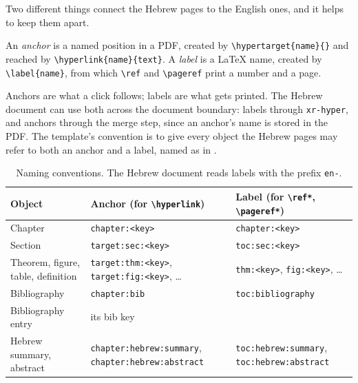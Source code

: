 

Two different things connect the Hebrew pages to the English ones, and it helps to keep them apart.

\begin{definition}
\label{def:anchor}\hypertarget{target:def:anchor}{}%
An \emph{anchor} is a named position in a PDF, created by \verb|\hypertarget{name}{}| and reached by \verb|\hyperlink{name}{text}|. A \emph{label} is a LaTeX name, created by \verb|\label{name}|, from which \verb|\ref| and \verb|\pageref| print a number and a page.
\end{definition}

Anchors are what a click follows; labels are what gets printed.
The Hebrew document can use both across the document boundary: labels through \texttt{xr-hyper}, and anchors through the merge step, since an anchor's name is stored in the PDF.
The template's convention is to give every object the Hebrew pages may refer to both an anchor and a label, named as in .

\begin{table}[htb]
    \centering
    \caption{Naming conventions. The Hebrew document reads labels with the prefix \texttt{en-}.}
    \label{tab:naming}\hypertarget{target:tab:naming}{}%
    \begin{tabular}{@{}>{\raggedright\arraybackslash}p{}>{\raggedright\arraybackslash}p{}>{\raggedright\arraybackslash}p{}@{}}
        \toprule
        Object & Anchor (for \verb|\hyperlink|) & Label (for \verb|\ref*|, \verb|\pageref*|) \\
        \midrule
        Chapter & \texttt{chapter:<key>} & \texttt{chapter:<key>} \\
        Section & \texttt{target:sec:<key>} & \texttt{toc:sec:<key>} \\
        Theorem, figure, table, definition & \texttt{target:thm:<key>}, \texttt{target:fig:<key>}, \ldots & \texttt{thm:<key>}, \texttt{fig:<key>}, \ldots \\
        Bibliography & \texttt{chapter:bib} & \texttt{toc:bibliography} \\
        Bibliography entry & its bib key & \\
        Hebrew summary, abstract & \texttt{chapter:hebrew:summary}, \texttt{chapter:hebrew:abstract} & \texttt{toc:hebrew:summary}, \texttt{toc:hebrew:abstract} \\
        \bottomrule
    \end{tabular}
\end{table}

